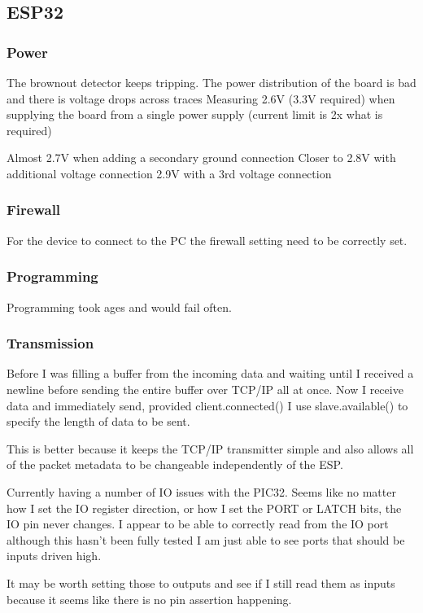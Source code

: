 \subsection{ESP32}
\subsubsection{Power}
The brownout detector keeps tripping.
The power distribution of the board is bad and there is voltage drops across traces
Measuring 2.6V (3.3V required) when supplying the board from a single power supply
(current limit is 2x what is required)

Almost 2.7V when adding a secondary ground connection
Closer to 2.8V with additional voltage connection
2.9V with a 3rd voltage connection

\subsubsection{Firewall}
For the device to connect to the PC the firewall setting need to be correctly set.

\subsubsection{Programming}
Programming took ages and would fail often.

\subsubsection{Transmission}
Before I was filling a buffer from the incoming data and waiting until I received
a newline before sending the entire buffer over TCP/IP all at once.
Now I receive data and immediately send, provided client.connected()
I use slave.available() to specify the length of data to be sent.

This is better because it keeps the TCP/IP transmitter simple and also allows all
of the packet metadata to be changeable independently of the ESP.

Currently having a number of IO issues with the PIC32.
Seems like no matter how I set the IO register direction, or how I set
the PORT or LATCH bits, the IO pin never changes.
I appear to be able to correctly read from the IO port although this
hasn't been fully tested I am just able to see ports that should be
inputs driven high.

It may be worth setting those to outputs and see if I still read them
as inputs because it seems like there is no pin assertion happening.

